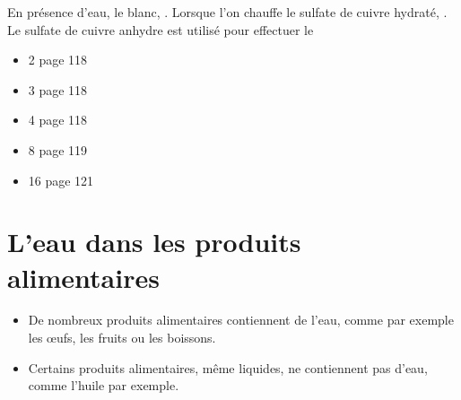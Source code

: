 \documentclass[12pt,a4paper]{article}
\begin{document}

\begin{mybilan}
	En présence d'eau, le  blanc, .
	Lorsque l'on chauffe le sulfate de cuivre hydraté, .
	Le sulfate de cuivre anhydre est utilisé pour effectuer le 
\end{mybilan}

\begin{myexos}
	\begin{multicols}{2}
	
		\begin{itemize}
			\item 2 page 118
			\item 3 page 118
			\item 4 page 118
			\item 8 page 119
			\item 16 page 121
		\end{itemize}
	
	\end{multicols}
\end{myexos}


\section{L'eau dans les produits alimentaires}

\begin{mybilan}
	\begin{itemize}
		\item De nombreux produits alimentaires contiennent de l'eau, comme par exemple les \oe ufs, les fruits ou les boissons.
		\item Certains produits alimentaires, même liquides, ne contiennent pas d'eau, comme l'huile par exemple.
	\end{itemize}
	
\end{mybilan}
\end{document}
